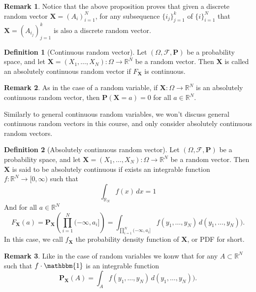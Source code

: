 \documentclass[11pt,a4paper]{article}
\theoremstyle{definition}
\newtheorem{definition}{Definition}[section]
\newtheorem{remark}{Remark}[section]
\theoremstyle{plain}
\newcommand{\R}{\mathbb{R}}
\newcommand{\Prob}{\mathbf{P}}
\renewcommand{\vec}[1]{\boldsymbol{\mathbf{#1}}}
\begin{document}
  \begin{remark}
    Notice that the above proposition proves that given a discrete random
    vector $\vec{X} = (A_i)_{i=1}^{N}$, for any subsequence $\{i_j\}_{j=1}^{k}$ of 
    $\{i\}_{i=1}^N$ that $\vec{X} = (A_{i_j})_{j=1}^k$ is also a discrete random
    vector.
  \end{remark}

  \begin{definition}[Continuous random vector]
    Let $(\Omega, \mathcal F, \Prob)$ be a probability space, 
    and let $\vec{X} = (X_1,\dots,X_N) \colon \Omega \to \R^N$ be a random vector.
    Then $\vec{X}$ is called an absolutely continuous random vector if 
    $F_{\vec{X}}$ is continuous.
  \end{definition}
  
  \begin{remark}
    As in the case of a random variable, if $\vec{X} \colon \Omega \to \R^N$ is
    an absolutely continuous random vector, 
    then $\Prob(\vec{X} = a) = 0$ for all $a \in \R^N$.
  \end{remark}
  
  Similarly to general continuous random variables, we won't discuss
  general continuous random vectors in this course, and only consider
  absolutely continuous random vectors.

  \begin{definition}[Absolutely continuous random vector]
    Let $(\Omega, \mathcal F, \Prob)$ be a probability space, 
    and let $\vec{X} = (X_1,\dots,X_N) \colon \Omega \to \R^N$ be a random vector.
    Then $\vec{X}$ is said to be absolutely continuous if exists an integrable 
    function $f \colon \R^N \to [0,\infty)$ such that 
    \[
      \int_{\R_N} f(x)\,dx = 1
    \]
    And for all $a \in \R^N$
    \[
      F_{\vec{X}}(a) = 
      \Prob_{\vec{X}}\left(\prod_{i=1}^{N} (-\infty,a_i]\right) =
      \int_{\prod_{i=1}^{N} (-\infty,a_i]} f(y_1,\dots,y_N)\,d(y_1,\dots,y_N)).
    \]
    In this case, we call $f_{\vec{X}}$ the probability density function of 
    $\vec{X}$, or PDF for short.
  \end{definition}

  \begin{remark}
    Like in the case of random variables we konw that for any $A \subset \R^N$
    such that $f \cdot \mathbbm{1}$ is an integrable function
    \[
      \Prob_{\vec{X}}(A) = 
      \int_{A} f(y_1,\dots,y_N)\,d(y_1,\dots,y_N)).
    \]
  \end{remark}
\end{document}
